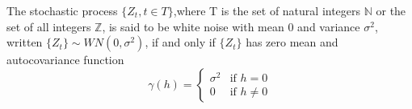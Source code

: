 \documentclass[12pt]{article}
\begin{document}
The stochastic process $\{ Z_t, t \in T \}$,where T is the set of natural integers $\mathbb{N}$ or the set of all integers $\mathbb{Z}$, is said to be white noise with mean 0 and variance $\sigma^2$, written 
$\{ Z_t\}\sim WN(0,\sigma^2)$, if and only if $\{ Z_t\}$ has zero mean and autocovariance function
\begin{displaymath}
\gamma\left(h\right) =
\left\{ 
\begin{array}{ll} 
\sigma^2 & \textrm{if } h=0 \\
0 & \textrm{if } h\neq 0  \end{array}
\right.
\end{displaymath}
\end{document}
